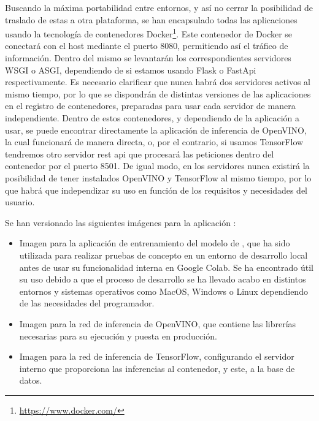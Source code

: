 Buscando la máxima portabilidad entre entornos, y así no cerrar la posibilidad de traslado de estas a otra plataforma, se han encapsulado todas las aplicaciones usando la tecnología de contenedores Docker\footnote{\url{https://www.docker.com/}}.
Este contenedor de Docker se conectará con el host mediante el puerto 8080, permitiendo así el tráfico de información.
Dentro del mismo se levantarán los correspondientes servidores WSGI o ASGI, dependiendo de si estamos usando Flask o FastApi respectivamente.
Es necesario clarificar que nunca habrá dos servidores activos al mismo tiempo, por lo que se dispondrán de distintas versiones de las aplicaciones en el registro de contenedores, preparadas para usar cada servidor de manera independiente.
Dentro de estos contenedores, y dependiendo de la aplicación a usar, se puede encontrar directamente la aplicación de inferencia de OpenVINO, la cual funcionará de manera directa, o, por el contrario, si usamos TensorFlow tendremos otro servidor rest api que procesará las peticiones dentro del contenedor por el puerto 8501.
De igual modo, en los servidores nunca existirá la posibilidad de tener instalados OpenVINO y TensorFlow al mismo tiempo, por lo que habrá que independizar su uso en función de los requisitos y necesidades del usuario.

Se han versionado las siguientes imágenes para la aplicación :
\begin{itemize}
    \item Imagen para la aplicación de entrenamiento del modelo de , que ha sido utilizada para realizar pruebas de concepto en un entorno de desarrollo local antes de usar su funcionalidad
    interna en Google Colab.
    Se ha encontrado útil su uso debido a que el proceso de desarrollo se ha llevado acabo en distintos entornos y sistemas operativos como MacOS, Windows o Linux dependiendo de las necesidades del programador.
    \item Imagen para la red de inferencia de OpenVINO, que contiene las librerías necesarias para su ejecución y puesta en producción.
    \item Imagen para la red de inferencia de TensorFlow, configurando el servidor interno que proporciona las inferencias al contenedor, y este, a la base de datos.
\end{itemize}

